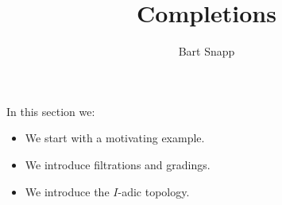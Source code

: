 \documentclass{ximera}
\author{Bart Snapp}
\title{Completions}
\begin{document}
\begin{abstract}
\end{abstract}
\maketitle
In this section we:

\begin{itemize}
\item We start with a motivating example.
\item We introduce filtrations and gradings.
\item We introduce the $I$-adic topology.
\end{itemize}
\end{document}
